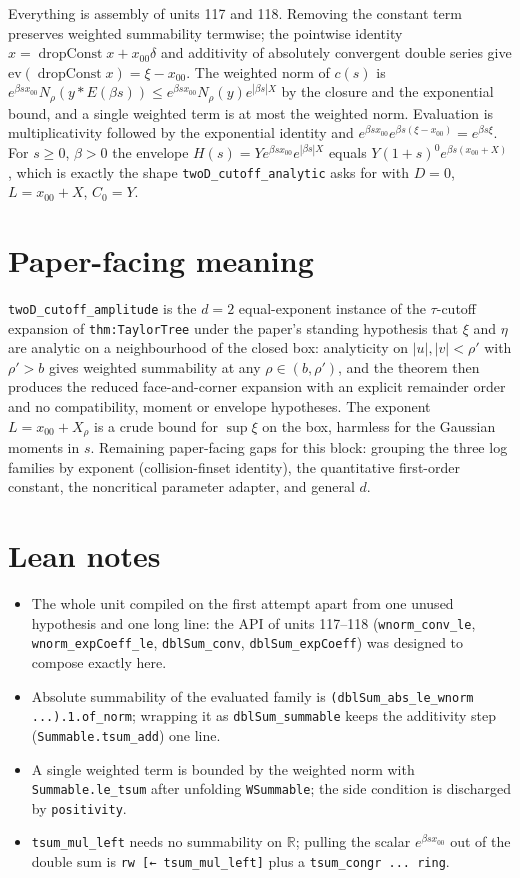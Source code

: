 \documentclass[11pt]{article}
\begin{document}
Everything is assembly of units 117 and 118. Removing the constant term preserves weighted
summability termwise; the pointwise identity $x=\operatorname{dropConst}x+x_{00}\delta$ and
additivity of absolutely convergent double series give
$\mathrm{ev}(\operatorname{dropConst}x)=\xi-x_{00}$. The weighted norm of $c(s)$ is
$e^{\beta sx_{00}}N_\rho(y*E(\beta s))\le e^{\beta sx_{00}}N_\rho(y)e^{|\beta s|X}$ by the closure
and the exponential bound, and a single weighted term is at most the weighted norm. Evaluation is
multiplicativity followed by the exponential identity and
$e^{\beta sx_{00}}e^{\beta s(\xi-x_{00})}=e^{\beta s\xi}$. For $s\ge0$, $\beta>0$ the envelope
$H(s)=Ye^{\beta sx_{00}}e^{|\beta s|X}$ equals $Y(1+s)^0e^{\beta s(x_{00}+X)}$, which is exactly the
shape \texttt{twoD\_cutoff\_analytic} asks for with $D=0$, $L=x_{00}+X$, $C_0=Y$.

\section{Paper-facing meaning}

\texttt{twoD\_cutoff\_amplitude} is the $d=2$ equal-exponent instance of the $\tau$-cutoff expansion
of \texttt{thm:TaylorTree} under the paper's standing hypothesis that $\xi$ and $\eta$ are analytic
on a neighbourhood of the closed box: analyticity on $|u|,|v|<\rho'$ with $\rho'>b$ gives weighted
summability at any $\rho\in(b,\rho')$, and the theorem then produces the reduced face-and-corner
expansion with an explicit remainder order and no compatibility, moment or envelope hypotheses.
The exponent $L=x_{00}+X_\rho$ is a crude bound for $\sup\xi$ on the box, harmless for the Gaussian
moments in $s$. Remaining paper-facing gaps for this block: grouping the three log families by
exponent (collision-finset identity), the quantitative first-order constant, the noncritical
parameter adapter, and general $d$.

\section{Lean notes}

\begin{itemize}
\item The whole unit compiled on the first attempt apart from one unused hypothesis and one long
line: the API of units 117--118 (\texttt{wnorm\_conv\_le}, \texttt{wnorm\_expCoeff\_le},
\texttt{dblSum\_conv}, \texttt{dblSum\_expCoeff}) was designed to compose exactly here.
\item Absolute summability of the evaluated family is
\texttt{(dblSum\_abs\_le\_wnorm ...).1.of\_norm}; wrapping it as \texttt{dblSum\_summable} keeps the
additivity step (\texttt{Summable.tsum\_add}) one line.
\item A single weighted term is bounded by the weighted norm with \texttt{Summable.le\_tsum} after
unfolding \texttt{WSummable}; the side condition is discharged by \texttt{positivity}.
\item \texttt{tsum\_mul\_left} needs no summability on $\mathbb R$; pulling the scalar
$e^{\beta sx_{00}}$ out of the double sum is \texttt{rw [← tsum\_mul\_left]} plus a
\texttt{tsum\_congr ... ring}.
\end{itemize}
\end{document}
